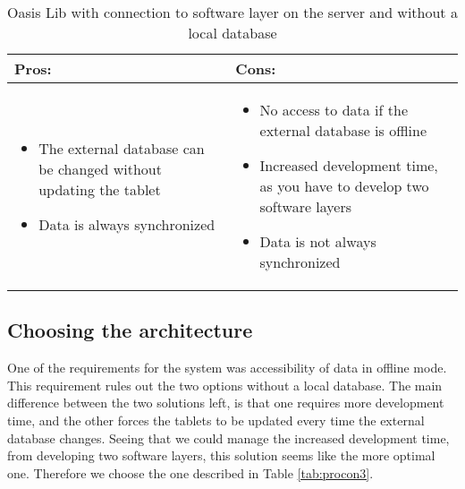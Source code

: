 \begin{table}[htbp]
	\centering
		\begin{tabular}{| p{6cm} | m{6cm} |}
			\hline
			\textbf{Pros:} & \textbf{Cons:} \\ \hline
\begin{itemize}
	\item The external database can be changed without updating the tablet
	\item Data is always synchronized
\end{itemize}
&
\begin{itemize}
	\item No access to data if the external database is offline
	\item Increased development time, as you have to develop two software layers
	\item Data is not always synchronized
\end{itemize}
\\ \hline
		\end{tabular}
	\caption{Oasis Lib with connection to software layer on the server and without a local database}
	\label{tab:procon4}
\end{table}

\subsection{Choosing the architecture}
One of the requirements for the system was accessibility of data in offline mode.
This requirement rules out the two options without a local database.
The main difference between the two solutions left, is that one requires more development time, and the other forces the tablets to be updated every time the external database changes.
Seeing that we could manage the increased development time, from developing two software layers, this solution seems like the more optimal one. Therefore we choose the one described in Table \vref{tab:procon3}.